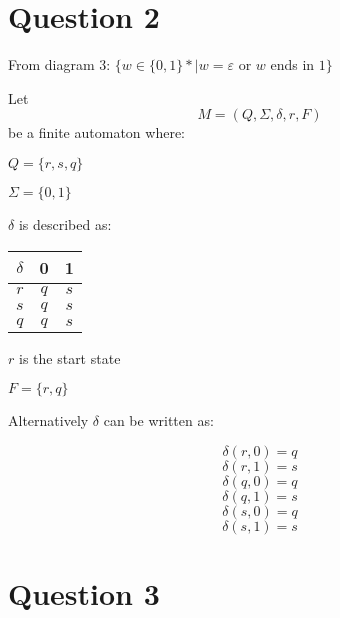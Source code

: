 \documentclass[11pt]{article}
\begin{document}
\begin{enumerate}
\begin{figure}[H]
    \end{figure}

\end{enumerate}

\section{Question 2}
From diagram 3: $\{w \in \{0, 1\}\ast | w = \varepsilon$ or $w$ ends in $1 \}$

Let
$$M = (Q,\Sigma,\delta,r,F)$$
be a finite automaton where:
\begin{center}
  $Q=\{r,s,q\}$
  
  $\Sigma=\{0,1\}$

  $\delta$ is described as:

  \begin{tabular}{ |c|c|c| }
    \hline
    $\delta$ & 0 & 1 \\
    \hline
    $r$ & $q$ & $s$ \\
    \hline
    $s$ & $q$ & $s$ \\
    \hline
    $q$ & $q$ & $s$ \\
    \hline
  \end{tabular}

  $r$ is the start state
  
  $F = \{r, q\}$
\end{center}

Alternatively $\delta$ can be written as:

$$\delta(r,0) = q$$
$$\delta(r,1) = s$$
$$\delta(q,0) = q$$
$$\delta(q,1) = s$$
$$\delta(s,0) = q$$
$$\delta(s,1) = s$$

\section{Question 3}
\end{document}
